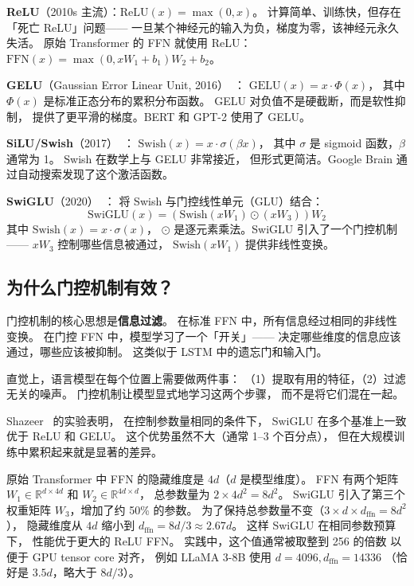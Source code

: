 \textbf{ReLU}（2010s 主流）：$\mathrm{ReLU}(x) = \max(0, x)$。
计算简单、训练快，但存在「死亡 ReLU」问题——
一旦某个神经元的输入为负，梯度为零，该神经元永久失活。
原始 Transformer 的 FFN 就使用 ReLU：
$\mathrm{FFN}(x) = \max(0, xW_1 + b_1) W_2 + b_2$。

\textbf{GELU}（Gaussian Error Linear Unit, 2016）~\cite{hendrycks2016gelu}：
$\mathrm{GELU}(x) = x \cdot \Phi(x)$，
其中 $\Phi(x)$ 是标准正态分布的累积分布函数。
GELU 对负值不是硬截断，而是软性抑制，
提供了更平滑的梯度。BERT 和 GPT-2 使用了 GELU。

\textbf{SiLU/Swish}（2017）~\cite{ramachandran2017swish}：
$\mathrm{Swish}(x) = x \cdot \sigma(\beta x)$，
其中 $\sigma$ 是 sigmoid 函数，$\beta$ 通常为 1。
Swish 在数学上与 GELU 非常接近，
但形式更简洁。Google Brain 通过自动搜索发现了这个激活函数。

\textbf{SwiGLU}（2020）~\cite{shazeer2020glu}：
将 Swish 与门控线性单元（GLU）结合：
\begin{equation}
  \mathrm{SwiGLU}(x) = \left(\mathrm{Swish}(x W_1) \odot (x W_3)\right) W_2
\end{equation}
其中 $\mathrm{Swish}(x) = x \cdot \sigma(x)$，
$\odot$ 是逐元素乘法。SwiGLU 引入了一个门控机制——
$xW_3$ 控制哪些信息被通过，
$\mathrm{Swish}(xW_1)$ 提供非线性变换。

\subsection{为什么门控机制有效？}

门控机制的核心思想是\textbf{信息过滤}。
在标准 FFN 中，所有信息经过相同的非线性变换。
在门控 FFN 中，模型学习了一个「开关」——
决定哪些维度的信息应该通过，哪些应该被抑制。
这类似于 LSTM 中的遗忘门和输入门。

直觉上，语言模型在每个位置上需要做两件事：
（1）提取有用的特征，（2）过滤无关的噪声。
门控机制让模型显式地学习这两个步骤，
而不是将它们混在一起。

Shazeer~\cite{shazeer2020glu} 的实验表明，
在控制参数量相同的条件下，
SwiGLU 在多个基准上一致优于 ReLU 和 GELU。
这个优势虽然不大（通常 1--3 个百分点），
但在大规模训练中累积起来就是显著的差异。

\begin{whybox}
原始 Transformer 中 FFN 的隐藏维度是 $4d$（$d$ 是模型维度）。
FFN 有两个矩阵 $W_1 \in \mathbb{R}^{d \times 4d}$ 和 $W_2 \in \mathbb{R}^{4d \times d}$，
总参数量为 $2 \times 4d^2 = 8d^2$。
SwiGLU 引入了第三个权重矩阵 $W_3$，增加了约 50\% 的参数。
为了保持总参数量不变（$3 \times d \times d_{\mathrm{ffn}} = 8d^2$），
隐藏维度从 $4d$ 缩小到 $d_{\mathrm{ffn}} = 8d/3 \approx 2.67d$。
这样 SwiGLU 在相同参数预算下，
性能优于更大的 ReLU FFN。
实践中，这个值通常被取整到 256 的倍数
以便于 GPU tensor core 对齐，
例如 LLaMA 3-8B 使用 $d = 4096, d_{\mathrm{ffn}} = 14336$
（恰好是 $3.5d$，略大于 $8d/3$）。
\end{whybox}

